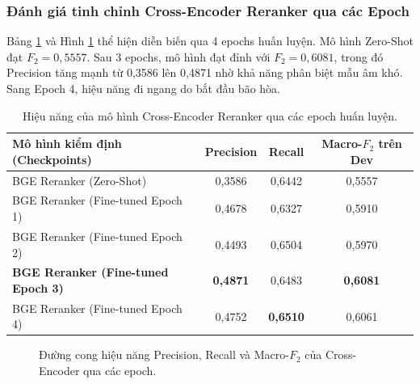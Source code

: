 \documentclass[12pt,a4paper]{article}
\begin{document}
\subsubsection{Đánh giá tinh chỉnh Cross-Encoder Reranker qua các Epoch}
Bảng \ref{tab:reranker_epochs} và Hình \ref{fig:learning_curve} thể hiện diễn biến qua 4 epochs huấn luyện. Mô hình Zero-Shot đạt $F_2 = 0,5557$. Sau 3 epochs, mô hình đạt đỉnh với $F_2 = 0,6081$, trong đó Precision tăng mạnh từ 0,3586 lên 0,4871 nhờ khả năng phân biệt mẫu âm khó. Sang Epoch 4, hiệu năng đi ngang do bắt đầu bão hòa.

\begin{table}[htbp]
\centering
\caption{Hiệu năng của mô hình Cross-Encoder Reranker qua các epoch huấn luyện.}
\label{tab:reranker_epochs}
\footnotesize
\begin{tabularx}{\textwidth}{X c c c}
\toprule
\textbf{Mô hình kiểm định (Checkpoints)} & \textbf{Precision} & \textbf{Recall} & \textbf{Macro-$F_2$ trên Dev} \\
\midrule
BGE Reranker (Zero-Shot) & 0,3586 & 0,6442 & 0,5557 \\
BGE Reranker (Fine-tuned Epoch 1) & 0,4678 & 0,6327 & 0,5910 \\
BGE Reranker (Fine-tuned Epoch 2) & 0,4493 & 0,6504 & 0,5970 \\
\textbf{BGE Reranker (Fine-tuned Epoch 3)} & \textbf{0,4871} & 0,6483 & \textbf{0,6081} \\
BGE Reranker (Fine-tuned Epoch 4) & 0,4752 & \textbf{0,6510} & 0,6061 \\
\bottomrule
\end{tabularx}
\end{table}

\begin{figure}[htbp]
\centering
{}
\caption{Đường cong hiệu năng Precision, Recall và Macro-$F_2$ của Cross-Encoder qua các epoch.}
\label{fig:learning_curve}
\end{figure}
\end{document}
